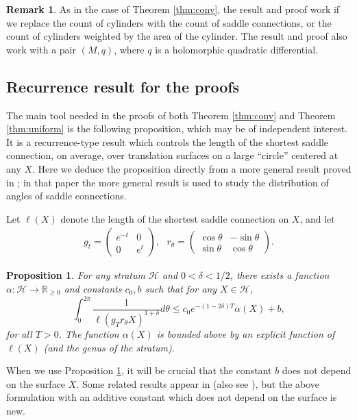 \documentclass{article}
\newtheorem{prop}{Proposition}[section]
\theoremstyle{definition}
\newtheorem{rmk}{Remark}[section]
\begin{document}
\begin{rmk} 
As in the case of Theorem \ref{thm:conv}, the result and proof work if we replace the count of cylinders with the count of saddle connections, or the count of cylinders weighted by the area of the cylinder.  The result and proof also work with a pair $(M,q)$, where $q$ is a holomorphic quadratic differential.
\end{rmk}

\subsection{Recurrence result for the proofs}
The main tool needed in the proofs of both Theorem \ref{thm:conv} and Theorem \ref{thm:uniform} is the following proposition, which may be of independent interest.  It is a recurrence-type result which controls the length of the shortest saddle connection, on average, over translation surfaces on a large ``circle'' centered at any $X$.  Here we deduce the proposition directly from a more general result proved in \cite{dozier2017}; in that paper the more general result is used to study the distribution of angles of saddle connections.  

Let $\ell(X)$ denote the length of the shortest saddle connection on $X$, and let 
\begin{eqnarray*}
  g_t =
  \left(\begin{matrix}
    e^{-t} & 0 \\
    0 & e^t
  \end{matrix}\right), \text{  \ \    } r_{\theta} = \left(
        \begin{matrix}
          \cos \theta & -\sin\theta \\
          \sin \theta & \cos\theta
        \end{matrix}\right).
\end{eqnarray*}


\begin{prop}
 For any stratum $\mathcal{H}$ and $0<\delta<1/2$, there exists a function $\alpha: \mathcal{H} \to \mathbb{R}_{\ge 0}$ and constants $c_0,b$ such that for any $X\in \mathcal{H}$,
$$\int_0^{2\pi} \frac{1}{\ell(g_Tr_{\theta}X)^{1+\delta}}d\theta \le c_0 e^{-(1-2\delta) T} \alpha(X) + b,$$
for all $T>0$.  The function $\alpha(X)$ is bounded above by an explicit function of $\ell(X)$ (and the genus of the stratum).  
\label{prop:ineq}
\end{prop}

When we use Proposition \ref{prop:ineq}, it will be crucial that the constant $b$ does not depend on the surface $X$.  Some related results appear in \cite{em2001} (also see \cite{athreya2006}), but the above formulation with an additive constant which does not depend on the surface is new.  
\end{document}
